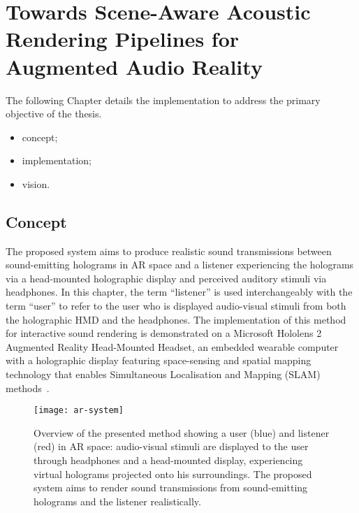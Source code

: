 \chapter{Towards Scene-Aware Acoustic Rendering Pipelines for Augmented Audio Reality}\label{ch:ar-pipeline}%
The following Chapter details the implementation to address the primary objective of the thesis.
\begin{itemize}
    \item concept;
    \item implementation;
    \item vision.
\end{itemize}

\section{Concept}\label{sec:overview}
The proposed system aims to produce realistic sound transmissions between sound-emitting holograms in AR space and a listener experiencing the holograms via a head-mounted holographic display and perceived auditory stimuli via headphones. In this chapter, the term ``listener'' is used interchangeably with the term ``user'' to refer to the user who is displayed audio-visual stimuli from both the holographic HMD and the headphones. The implementation of this method for interactive sound rendering is demonstrated on a Microsoft Hololens 2 Augmented Reality Head-Mounted Headset, an embedded wearable computer with a holographic display featuring space-sensing and spatial mapping technology that enables Simultaneous Localisation and Mapping (SLAM) methods~\cite{davison2003real, ungureanu2020hololens}.

\begin{figure}[htb]
    \centering
    \texttt{[image: ar-system]}
    \caption{Overview of the presented method showing a user (blue) and listener (red) in AR space: audio-visual stimuli are displayed to the user through headphones and a head-mounted display, experiencing virtual holograms projected onto his surroundings. The proposed system aims to render sound transmissions from sound-emitting holograms and the listener realistically.}
\label{fig:method-overview}
\end{figure}

